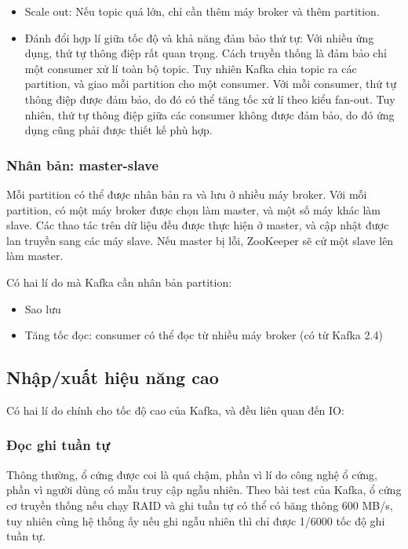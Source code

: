\documentclass{article}
\begin{document}
\begin{itemize}
    \item Scale out: Nếu topic quá lớn, chỉ cần thêm máy broker và thêm
        partition.
    \item Đánh đổi hợp lí giữa tốc độ và khả năng đảm bảo thứ tự: Với nhiều ứng
        dụng, thứ tự thông điệp rất quan trọng. Cách truyền thống là đảm bảo chỉ
        một consumer xử lí toàn bộ topic. Tuy nhiên Kafka chia topic ra các
        partition, và giao mỗi partition cho một consumer. Với mỗi consumer, thứ
        tự thông điệp được đảm bảo, do đó có thể tăng tốc xử lí theo kiểu
        fan-out. Tuy nhiên, thứ tự thông điệp giữa các consumer không được đảm
        bảo, do đó ứng dụng cũng phải được thiết kế phù hợp.
\end{itemize}

\subsubsection{Nhân bản: master-slave}

Mỗi partition có thể được nhân bản ra và lưu ở nhiều máy broker. Với mỗi
partition, có một máy broker được chọn làm master, và một số máy khác làm slave.
Các thao tác trên dữ liệu đều được thực hiện ở master, và cập nhật được lan
truyền sang các máy slave. Nếu master bị lỗi, ZooKeeper sẽ cử một slave lên làm
master.

Có hai lí do mà Kafka cần nhân bản partition:

\begin{itemize}
    \item Sao lưu
    \item Tăng tốc đọc: consumer có thể đọc từ nhiều máy broker (có từ Kafka
        2.4)
\end{itemize}

\subsection{Nhập/xuất hiệu năng cao}

Có hai lí do chính cho tốc độ cao của Kafka, và đều liên quan đến IO:

\subsubsection{Đọc ghi tuần tự}

Thông thường, ổ cứng được coi là quá chậm, phần vì lí do công nghệ ổ cứng, phần
vì người dùng có mẫu truy cập ngẫu nhiên. Theo bài test của Kafka, ổ cứng cơ
truyền thống nếu chạy RAID và ghi tuần tự có thể có băng thông 600 MB/s, tuy
nhiên cùng hệ thống ấy nếu ghi ngẫu nhiên thì chỉ được 1/6000 tốc độ ghi tuần
tự.
\end{document}
